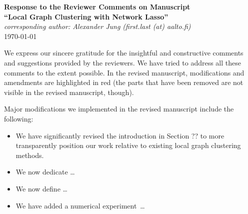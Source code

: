 \documentclass[11pt,onecolumn]{IEEEtran}
\begin{document}


\begin{center}
{\bf\Large Response to the Reviewer Comments on Manuscript}\\[2mm]
{\bf\Large ``Local Graph Clustering with Network Lasso''}\\[7mm]
{\em\large corresponding author: Alexander Jung (first.last (at) aalto.fi)}\\[6.0mm]
\today
\end{center}



\vspace{7mm}

We express our sincere gratitude for the insightful and constructive comments and suggestions 
provided by the reviewers. We have tried to address all these comments 
to the extent possible. In the revised manuscript, modifications and amendments are highlighted 
in red (the parts that have been removed are not visible in the revised manuscript, though).

Major modifications we implemented in the revised manuscript include the following:

\vspace{2mm}

\begin{itemize}

\item We have significantly revised the introduction in Section ?? to more transparently position our work relative to 
existing local graph clustering methods.  \\[1mm]

\item  We now dedicate \ldots \\[1mm]

\item  We now define \ldots \\[1mm]

\item  We have added a numerical experiment \ldots \\[1mm]


\end{itemize}
\end{document}

